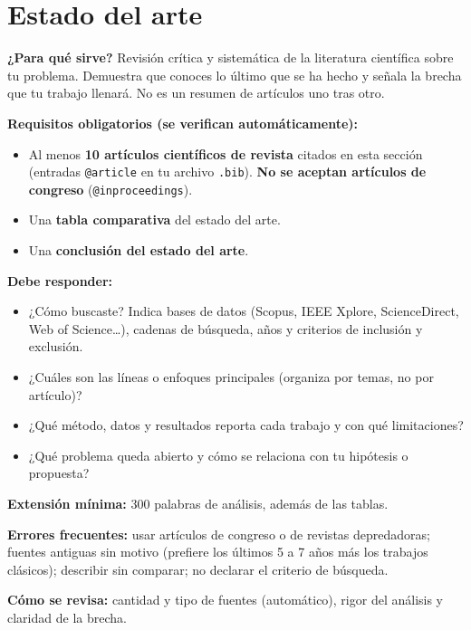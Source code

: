 
\section{Estado del arte} \label{sec:estado_arte} %

\begin{guia}
\textbf{¿Para qué sirve?} Revisión crítica y sistemática de la literatura científica sobre tu problema. Demuestra que
conoces lo último que se ha hecho y señala la brecha que tu trabajo llenará. No es un resumen de artículos uno tras otro.

\textbf{Requisitos obligatorios (se verifican automáticamente):}
\begin{itemize}[nosep,leftmargin=*]
  \item Al menos \textbf{10 artículos científicos de revista} citados en esta sección (entradas \verb|@article| en tu
        archivo \verb|.bib|). \textbf{No se aceptan artículos de congreso} (\verb|@inproceedings|).
  \item Una \textbf{tabla comparativa} del estado del arte.
  \item Una \textbf{conclusión del estado del arte}.
\end{itemize}

\textbf{Debe responder:}
\begin{itemize}[nosep,leftmargin=*]
  \item ¿Cómo buscaste? Indica bases de datos (Scopus, IEEE Xplore, ScienceDirect, Web of Science\ldots), cadenas de
        búsqueda, años y criterios de inclusión y exclusión.
  \item ¿Cuáles son las líneas o enfoques principales (organiza por temas, no por artículo)?
  \item ¿Qué método, datos y resultados reporta cada trabajo y con qué limitaciones?
  \item ¿Qué problema queda abierto y cómo se relaciona con tu hipótesis o propuesta?
\end{itemize}

\textbf{Extensión mínima:} 300 palabras de análisis, además de las tablas.

\textbf{Errores frecuentes:} usar artículos de congreso o de revistas depredadoras; fuentes antiguas sin motivo (prefiere
los últimos 5 a 7 años más los trabajos clásicos); describir sin comparar; no declarar el criterio de búsqueda.

\textbf{Cómo se revisa:} cantidad y tipo de fuentes (automático), rigor del análisis y claridad de la brecha.
\end{guia}

